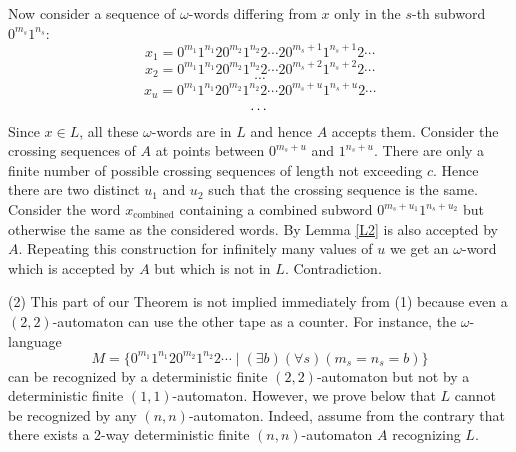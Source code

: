 \documentclass{llncs}
\begin{document}
Now consider a sequence of $\omega$-words differing from $x$ only in the $s$-th subword $0^{m_s}1^{n_s}$:
$$
x_1 = 0^{m_1}1^{n_1}20^{m_2}1^{n_2}2\cdots 20^{m_s+1}1^{n_s+1}2\cdots 
$$
$$
x_2 = 0^{m_1}1^{n_1}20^{m_2}1^{n_2}2\cdots 20^{m_s+2}1^{n_s+2}2\cdots 
$$
$$
\cdots 
$$
$$
x_u = 0^{m_1}1^{n_1}20^{m_2}1^{n_2}2\cdots 20^{m_s+u}1^{n_s+u}2\cdots 
$$
$$
\cdots \\
$$
Since $x \in L$, all these $\omega $-words are in $L$ and hence $A$ accepts them. Consider the crossing sequences
of $A$ at points between $0^{m_s+u}$ and $1^{n_s+u}$. There are only a finite number of possible crossing sequences of length not exceeding $c$.
 Hence there are two distinct  $u_1$ and $u_2$ such that the crossing sequence is the same. Consider the word $x_{\mbox{combined}}$ containing a combined subword $0^{m_s+u_1}1^{n_s+u_2}$ but otherwise the same as the considered words. By Lemma \ref{L2} is also accepted by $A$. Repeating this construction for infinitely many values of $u$ we get an $\omega $-word which is accepted by $A$ but which is not in $L$. Contradiction.
 
\bigskip

(2) This part of our Theorem is not implied immediately from (1) because 
even a $(2,2)$-automaton can use the other tape as a counter. For instance, the $\omega $-language
$$
M = \{0^{m_1}1^{n_1}20^{m_2}1^{n_2}2\cdots \mid (\exists b)(\forall s) (m_s = n_s = b)\}
$$
can be recognized by a deterministic finite $(2,2)$-automaton but not by a deterministic finite $(1,1)$-automaton.
However, we prove below that $L$ cannot be recognized by any $(n,n)$-automaton. Indeed, 
assume from the contrary that  there exists a 2-way deterministic finite
$(n,n)$-automaton $A$ recognizing $L$. 
 
\end{document}
